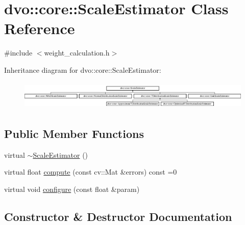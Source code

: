 \hypertarget{classdvo_1_1core_1_1_scale_estimator}{}\section{dvo\+:\+:core\+:\+:Scale\+Estimator Class Reference}
\label{classdvo_1_1core_1_1_scale_estimator}


{\ttfamily \#include $<$weight\+\_\+calculation.\+h$>$}

Inheritance diagram for dvo\+:\+:core\+:\+:Scale\+Estimator\+:\begin{figure}[H]
\begin{center}
\leavevmode
\includegraphics[height=1.390728cm]{classdvo_1_1core_1_1_scale_estimator}
\end{center}
\end{figure}
\subsection*{Public Member Functions}
\begin{DoxyCompactItemize}
\item 
virtual \mbox{\hyperlink{classdvo_1_1core_1_1_scale_estimator_a3987049356b11a891d2cad16ebbbc934}{$\sim$\+Scale\+Estimator}} ()
\item 
virtual float \mbox{\hyperlink{classdvo_1_1core_1_1_scale_estimator_a6968ac2cd37c2ce1c966f0c9e17d1a3c}{compute}} (const cv\+::\+Mat \&errors) const =0
\item 
virtual void \mbox{\hyperlink{classdvo_1_1core_1_1_scale_estimator_a58b5d7926b08e85e7393436156f3ef43}{configure}} (const float \&param)
\end{DoxyCompactItemize}


\subsection{Constructor \& Destructor Documentation}
\mbox{\label{classdvo_1_1core_1_1_scale_estimator_a3987049356b11a891d2cad16ebbbc934}} 
